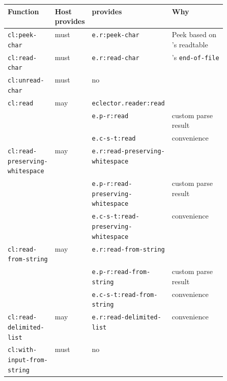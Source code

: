 \begin{table}
  \begin{tabular}{l|p{.08\linewidth}|p{0.25\linewidth}|p{0.25\linewidth}}
    Function                               & Host provides & \sysname{} provides                         & Why \\
    \hline
    \texttt{cl:peek-char}                  & must          & \texttt{e.r:peek-char}                      & Peek based on \sysname{}'s readtable\\
    \texttt{cl:read-char}                  & must          & \texttt{e.r:read-char}                      & \sysname{}'s \texttt{end-of-file}\\
    \texttt{cl:unread-char}                & must          & no                                          & \\
    \hline
    \texttt{cl:read}                       & may           & \texttt{eclector.reader:read}               & \\
                                           &               & \texttt{e.p-r:read}                         & custom parse result \\
                                           &               & \texttt{e.c-s-t:read}                       & convenience \\
    \texttt{cl:read-preserving-whitespace} & may           & \texttt{e.r:read-preserving-whitespace}     & \\
                                           &               & \texttt{e.p-r:read-preserving-whitespace}   & custom parse result \\
                                           &               & \texttt{e.c-s-t:read-preserving-whitespace} & convenience \\
    \texttt{cl:read-from-string}           & may           & \texttt{e.r:read-from-string}               & \\
                                           &               & \texttt{e.p-r:read-from-string}             & custom parse result \\
                                           &               & \texttt{e.c-s-t:read-from-string}           & convenience \\
    \texttt{cl:read-delimited-list}        & may           & \texttt{e.r:read-delimited-list}            & convenience \\
    \hline
    \texttt{cl:with-input-from-string}     & must          & no                                      & \\
  \end{tabular}
\end{table}

